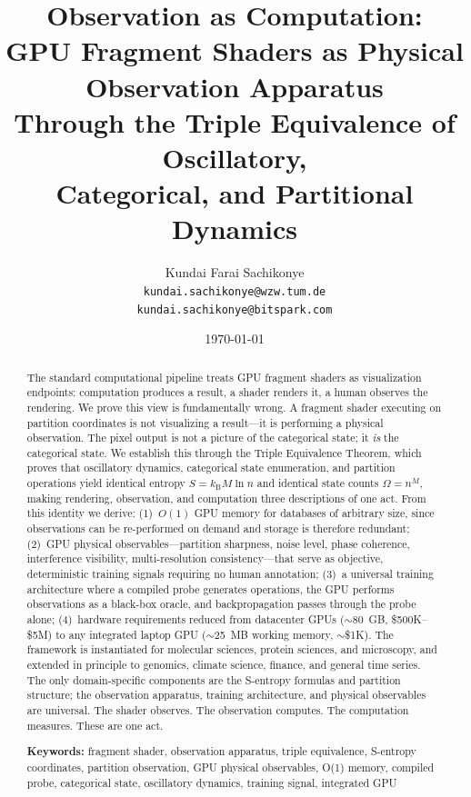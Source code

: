\documentclass[11pt,twocolumn,a4paper]{article}
\title{\textbf{Observation as Computation:\\
GPU Fragment Shaders as Physical Observation Apparatus\\
Through the Triple Equivalence of Oscillatory,\\
Categorical, and Partitional Dynamics}}
\author{
Kundai Farai Sachikonye\\
\texttt{kundai.sachikonye@wzw.tum.de}\\
\texttt{kundai.sachikonye@bitspark.com}
}
\date{\today}
\theoremstyle{definition}
\theoremstyle{remark}
\newcommand{\kB}{k_{\mathrm{B}}}
\begin{document}
\maketitle

\begin{abstract}
The standard computational pipeline treats GPU fragment shaders as visualization endpoints: computation produces a result, a shader renders it, a human observes the rendering. We prove this view is fundamentally wrong. A fragment shader executing on partition coordinates is not visualizing a result---it is performing a physical observation. The pixel output is not a picture of the categorical state; it \emph{is} the categorical state. We establish this through the Triple Equivalence Theorem, which proves that oscillatory dynamics, categorical state enumeration, and partition operations yield identical entropy $S = \kB M \ln n$ and identical state counts $\Omega = n^M$, making rendering, observation, and computation three descriptions of one act. From this identity we derive: (1)~$O(1)$ GPU memory for databases of arbitrary size, since observations can be re-performed on demand and storage is therefore redundant; (2)~GPU physical observables---partition sharpness, noise level, phase coherence, interference visibility, multi-resolution consistency---that serve as objective, deterministic training signals requiring no human annotation; (3)~a universal training architecture where a compiled probe generates operations, the GPU performs observations as a black-box oracle, and backpropagation passes through the probe alone; (4)~hardware requirements reduced from datacenter GPUs ($\sim$80~GB, \$500K--\$5M) to any integrated laptop GPU ($\sim$25~MB working memory, $\sim$\$1K). The framework is instantiated for molecular sciences, protein sciences, and microscopy, and extended in principle to genomics, climate science, finance, and general time series. The only domain-specific components are the S-entropy formulas and partition structure; the observation apparatus, training architecture, and physical observables are universal. The shader observes. The observation computes. The computation measures. These are one act.

\medskip
\noindent\textbf{Keywords:} fragment shader, observation apparatus, triple equivalence, S-entropy coordinates, partition observation, GPU physical observables, O(1) memory, compiled probe, categorical state, oscillatory dynamics, training signal, integrated GPU
\end{abstract}
\end{document}

